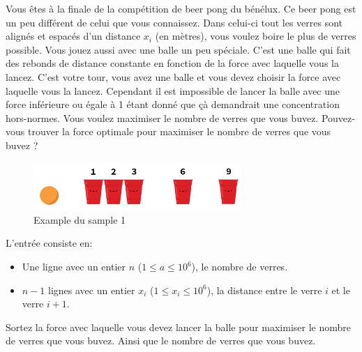 \problemname{\problemyamlname}


\newcommand{\maxn}{10^{6}}

Vous êtes à la finale de la compétition de beer pong du bénélux. Ce beer pong est un peu différent de celui que vous connaissez. Dans celui-ci tout les verres sont alignés et espacés d'un distance $x_i$ (en mètres), vous voulez boire le plus de verres possible. Vous jouez aussi avec une balle un peu spéciale. C'est une balle qui fait des rebonds de distance constante en fonction de la force avec laquelle vous la lancez.
C'est votre tour, vous avez une balle et vous devez choisir la force avec laquelle vous la lancez. Cependant il est impossible de lancer la balle avec une force inférieure ou égale à 1 étant donné que çà demandrait une concentration hors-normes. Vous voulez maximiser le nombre de verres que vous buvez. Pouvez-vous trouver la force optimale pour maximiser le nombre de verres que vous buvez ?
\smallskip
\begin{figure}[h]
    \centering
    \includegraphics[width=0.7\textwidth]{illustration.png}
    \caption{Example du sample 1}
\end{figure}

\begin{Input}
    L'entrée consiste en:
    \begin{itemize}
        \item Une ligne avec un entier  $n$ ($1\leq a\leq \maxn$), le nombre de verres.
        \item $n-1$ lignes avec un entier $x_i$ ($1\leq x_i\leq \maxn$), la distance entre le verre $i$ et le verre $i+1$.
    \end{itemize}
\end{Input}

\begin{Output}
    Sortez la force avec laquelle vous devez lancer la balle pour maximiser le nombre de verres que vous buvez. Ainsi que le nombre de verres que vous buvez.
\end{Output}
